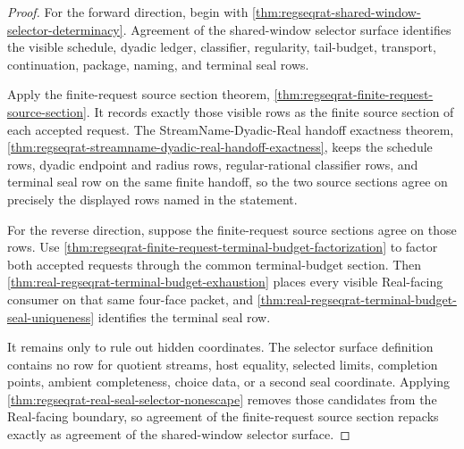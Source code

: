 \begin{proof}
For the forward direction, begin with \autoref{thm:regseqrat-shared-window-selector-determinacy}. Agreement of the shared-window selector surface identifies the visible schedule, dyadic ledger, classifier, regularity, tail-budget, transport, continuation, package, naming, and terminal seal rows.

Apply the finite-request source section theorem, \autoref{thm:regseqrat-finite-request-source-section}. It records exactly those visible rows as the finite source section of each accepted request. The StreamName-Dyadic-Real handoff exactness theorem, \autoref{thm:regseqrat-streamname-dyadic-real-handoff-exactness}, keeps the schedule rows, dyadic endpoint and radius rows, regular-rational classifier rows, and terminal seal row on the same finite handoff, so the two source sections agree on precisely the displayed rows named in the statement.

For the reverse direction, suppose the finite-request source sections agree on those rows. Use \autoref{thm:regseqrat-finite-request-terminal-budget-factorization} to factor both accepted requests through the common terminal-budget section. Then \autoref{thm:real-regseqrat-terminal-budget-exhaustion} places every visible Real-facing consumer on that same four-face packet, and \autoref{thm:real-regseqrat-terminal-budget-seal-uniqueness} identifies the terminal seal row.

It remains only to rule out hidden coordinates. The selector surface definition contains no row for quotient streams, host equality, selected limits, completion points, ambient completeness, choice data, or a second seal coordinate. Applying \autoref{thm:regseqrat-real-seal-selector-nonescape} removes those candidates from the Real-facing boundary, so agreement of the finite-request source section repacks exactly as agreement of the shared-window selector surface.
\end{proof}

